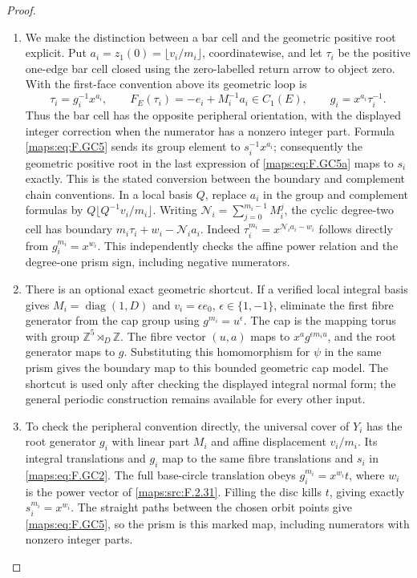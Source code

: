 \documentclass[11pt,a4paper]{article}
\theoremstyle{definition}
\begin{document}
\begin{proof}
\begin{enumerate}[label=\arabic*.]
\item We make the distinction between a bar cell and the geometric
positive root explicit.  Put
$a_i=z_1(0)=\lfloor v_i/m_i\rfloor$, coordinatewise, and
let $\tau_i$ be the positive one-edge bar cell closed using
the zero-labelled return arrow to object zero.  With the
first-face convention above its geometric loop is
\[
 \tau_i=g_i^{-1}x^{a_i},\qquad
 F_E(\tau_i)=-e_i+M_i^{-1}a_i\in C_1(E),\qquad
 g_i=x^{a_i}\tau_i^{-1}.                                  \tag{F.GC5a}\label{maps:eq:F.GC5a}
\]
Thus the bar cell has the opposite peripheral orientation,
with the displayed integer correction when the numerator
has a nonzero integer part.  Formula \eqref{maps:eq:F.GC5} sends its
group element to $s_i^{-1}x^{a_i}$; consequently the
geometric positive root in the last expression of \eqref{maps:eq:F.GC5a}
maps to $s_i$ exactly.  This is the stated conversion between
the boundary and complement chain conventions.  In a local basis
$Q$, replace $a_i$ in the group and complement formulas by
$Q\lfloor Q^{-1}v_i/m_i\rfloor$.
Writing $\mathcal N_i=\sum_{j=0}^{m_i-1}M_i^j$, the cyclic
degree-two cell has boundary
$m_i\tau_i+w_i-\mathcal N_i a_i$.
Indeed $\tau_i^{m_i}=x^{\mathcal N_i a_i-w_i}$ follows
directly from $g_i^{m_i}=x^{w_i}$.
This independently checks the affine power relation and
the degree-one prism sign, including negative numerators.

\item There is an optional exact geometric shortcut.  If a verified
local integral basis gives $M_i=\operatorname{diag}(1,D)$ and
$v_i=\epsilon e_0$, $\epsilon\in\{1,-1\}$, eliminate the
first fibre generator from the cap group using
$g^{m_i}=u^\epsilon$.  The cap is the mapping torus with
group $\mathbb Z^5\rtimes_D\mathbb Z$.
The fibre vector $(u,a)$ maps to $x^a g^{\epsilon m_i u}$,
and the root generator maps to $g$.  Substituting this
homomorphism for $\psi$ in the same prism gives the boundary
map to this bounded geometric cap model.  The shortcut is
used only after checking the displayed integral normal form;
the general periodic construction remains available for
every other input.

\item To check the peripheral convention directly, the universal
cover of $Y_i$ has the root generator $g_i$ with linear part
$M_i$ and affine displacement $v_i/m_i$.  Its integral
translations and $g_i$ map to the same fibre translations
and $s_i$ in \eqref{maps:eq:F.GC2}.  The full base-circle translation obeys
$g_i^{m_i}=x^{w_i}t$, where $w_i$ is the power vector of
\ref{maps:src:F.2.31}.  Filling the disc kills $t$, giving exactly
$s_i^{m_i}=x^{w_i}$.  The straight paths between the chosen
orbit points give \eqref{maps:eq:F.GC5}, so the prism is this marked map,
including numerators with nonzero integer parts.


\end{enumerate}
\end{proof}
\end{document}
